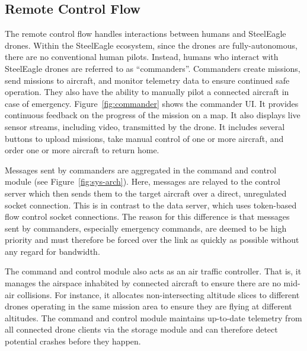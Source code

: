 \subsection{Remote Control Flow}
The remote control flow handles interactions between humans and SteelEagle drones. Within the SteelEagle ecosystem, since the drones are fully-autonomous, there are no conventional human pilots. Instead, humans who interact with SteelEagle drones are referred to as ``commanders''. Commanders create missions, send missions to aircraft, and monitor telemetry data to ensure continued safe operation. They also have the ability to manually pilot a connected aircraft in case of emergency. Figure~\ref{fig:commander} shows the commander UI. It provides continuous feedback on the progress of the mission on a map.  It also displays live sensor streams, including video, transmitted by the drone. It includes several buttons to upload missions, take manual control of one or more aircraft, and order one or more aircraft to return home.

Messages sent by commanders are aggregated in the command and control module (see Figure~\ref{fig:sys-arch}). Here, messages are relayed to the control server which then sends them to the target aircraft over a direct, unregulated socket connection. This is in contrast to the data server, which uses token-based flow control socket connections. The reason for this difference is that messages sent by commanders, especially emergency commands, are deemed to be high priority and must therefore be forced over the link as quickly as possible without any regard for bandwidth.

The command and control module also acts as an air traffic controller. That is, it manages the airspace inhabited by connected aircraft to ensure there are no mid-air collisions. For instance, it allocates non-intersecting altitude slices to different drones operating in the same mission area to ensure they are flying at different altitudes. The command and control module maintains up-to-date telemetry from all connected drone clients via the storage module and can therefore detect potential crashes before they happen.

